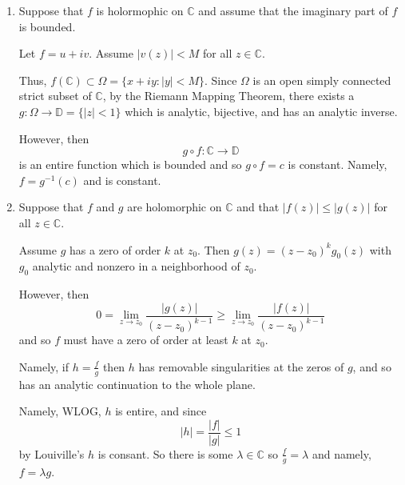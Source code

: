 \documentclass[12pt]{Qual}
\begin{document}
\begin{solution}$\,$
\begin{enumerate}[label=(\alph*)]
    \item Suppose that $f$ is holormophic on $\mathbb{C}$ and assume that the imaginary part of $f$ is bounded.

    Let $f=u+iv$. Assume $|v(z)|< M$ for all $z\in\mathbb{C}$.

    Thus, $f(\mathbb{C})\subset\Omega=\{x+iy:|y|<M\}$. Since $\Omega$ is an open simply connected strict subset of $\mathbb{C}$, by the Riemann Mapping Theorem, there exists a $g:\Omega\to\mathbb{D}=\{|z|<1\}$ which is analytic, bijective, and has an analytic inverse.

    However, then $$g\circ f:\mathbb{C}\to\mathbb{D}$$ is an entire function which is bounded and so $g\circ f=c$ is constant. Namely, $f=g^{-1}(c)$ and is constant.

    \item Suppose that $f$ and $g$ are holomorphic on $\mathbb{C}$ and that $|f(z)|\le|g(z)|$ for all $z\in\mathbb{C}$.

    Assume $g$ has a zero of order $k$ at $z_0$. Then $g(z)=(z-z_0)^kg_0(z)$ with $g_0$ analytic and nonzero in a neighborhood of $z_0$.

    However, then $$0=\lim_{z\to z_0}\frac{|g(z)|}{(z-z_0)^{k-1}}\ge\lim_{z\to z_0}\frac{|f(z)|}{(z-z_0)^{k-1}}$$ and so $f$ must have a zero of order at least $k$ at $z_0$.

    Namely, if $h=\frac{f}{g}$ then $h$ has removable singularities at the zeros of $g$, and so has an analytic continuation to the whole plane.

    Namely, WLOG, $h$ is entire, and since $$|h|=\frac{|f|}{|g|}\le 1$$ by Louiville's $h$ is consant. So there is some $\lambda\in\mathbb{C}$
    so $\frac{f}{g}=\lambda$ and namely, $f=\lambda g$.
\end{enumerate}
\end{solution}
\end{document}
